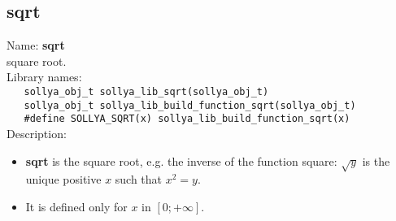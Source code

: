 \subsection{sqrt}
\label{labsqrt}
\noindent Name: \textbf{sqrt}\\
\phantom{aaa}square root.\\[0.2cm]
\noindent Library names:\\
\verb|   sollya_obj_t sollya_lib_sqrt(sollya_obj_t)|\\
\verb|   sollya_obj_t sollya_lib_build_function_sqrt(sollya_obj_t)|\\
\verb|   #define SOLLYA_SQRT(x) sollya_lib_build_function_sqrt(x)|\\[0.2cm]
\noindent Description: \begin{itemize}

\item \textbf{sqrt} is the square root, e.g. the inverse of the function square: $\sqrt{y}$
   is the unique positive $x$ such that $x^2=y$.

\item It is defined only for $x$ in $[0;+\infty]$.
\end{itemize}
